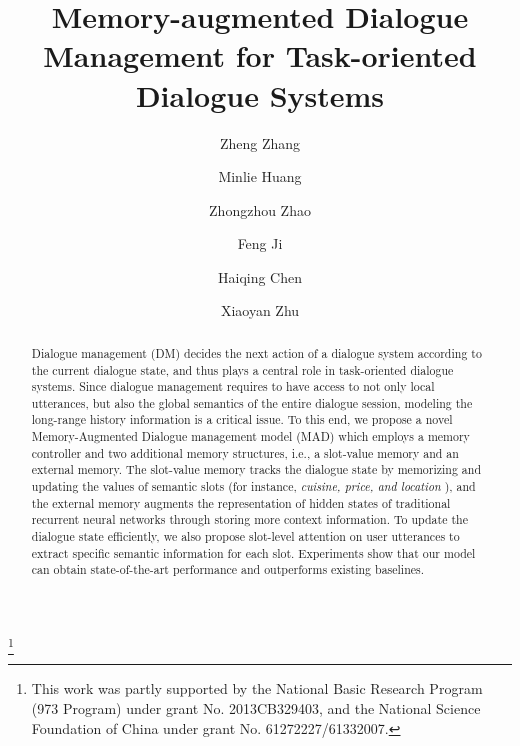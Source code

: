 \documentclass[format=acmsmall, review=false, screen=true]{acmart}
\begin{document}
\title[Memory-augmented Dialogue Management for Task-oriented Dialogue Systems]{Memory-augmented Dialogue Management for Task-oriented Dialogue Systems}
\thanks{This work was partly supported by the National Basic Research Program (973 Program) under grant No. 2013CB329403, and the National Science Foundation of China under grant No. 61272227/61332007.}
\author{Zheng Zhang}
\author{Minlie Huang}

\author{Zhongzhou Zhao}
\author{Feng Ji}
\author{Haiqing Chen}

\author{Xiaoyan Zhu}


\begin{abstract}
Dialogue management (DM) decides the next action of a dialogue system according to the current dialogue state, and thus plays a central role in task-oriented dialogue systems. 
Since dialogue management requires to have access to not only local utterances, but also the global semantics of the entire dialogue session, modeling the long-range history information is a critical issue. To this end, we propose a novel Memory-Augmented Dialogue management model (MAD) which employs a memory controller and two additional memory structures, i.e., a slot-value memory and an external memory. The slot-value memory tracks the dialogue state by memorizing and updating the values of semantic slots (for instance, {\it cuisine, price, and location }), and the external memory augments the representation of hidden states of traditional recurrent neural networks through storing more context information. To update the dialogue state efficiently, we also propose slot-level attention on user utterances to extract specific semantic information for each slot.
Experiments show that our model can obtain state-of-the-art performance and outperforms existing baselines.
\end{abstract}
\end{document}
